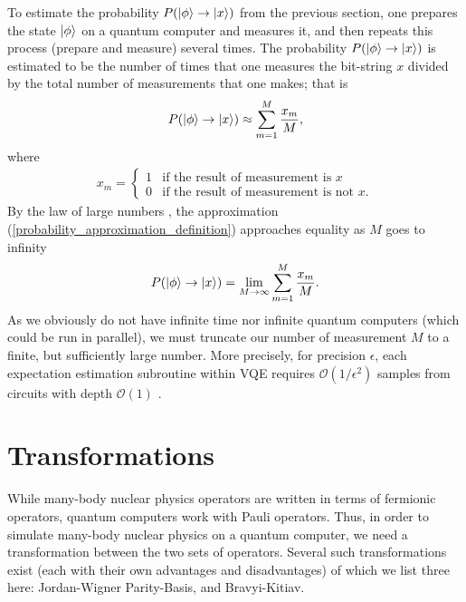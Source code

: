 \documentclass[Dual]{msu-thesis}
\begin{document}
To estimate the probability $P(\ket{\phi}\to \ket{x})$ from the previous section, one prepares the state $\ket{\phi}$ on a quantum computer and measures it, and then repeats this process (prepare and measure) several times. The probability $P(\ket{\phi}\to \ket{x})$ is estimated to be the number of times that one measures the bit-string $x$ divided by the total number of measurements that one makes; that is
\begin{align}
\label{probability_approximation_definition}
P(\ket{\phi}\to \ket{x}) \approx \sum_{m=1}^M\frac{x_m}{M}
,\end{align}
where 
\begin{align}
x_m
=
\begin{cases}
1 & \text{if the result of measurement is $x$} 
\\
0 & \text{if the result of measurement is not $x$}.
\end{cases}
\end{align}
By the law of large numbers \cite{ref:lln}, the approximation (\ref{probability_approximation_definition}) approaches equality as $M$ goes to infinity
\begin{align}
\label{probability_approximation_definition}
P(\ket{\phi}\to \ket{x}) = \lim_{M\to\infty}\sum_{m=1}^M\frac{x_m}{M}
.\end{align}
As we obviously do not have infinite time nor infinite quantum computers (which could be run in parallel), we must truncate our number of measurement $M$ to a finite, but sufficiently large number. More precisely, for precision $\epsilon$, each expectation estimation subroutine within VQE requires $\mathcal{O}(1/\epsilon^2)$ samples from circuits with depth $\mathcal{O}(1)$ \cite{ref:precision}.

\section{Transformations}

While many-body nuclear physics operators are written in terms of fermionic operators, quantum computers work with Pauli operators. Thus, in order to simulate many-body nuclear physics on a quantum computer, we need a transformation between the two sets of operators. Several such transformations exist \cite{ref:transformations} (each with their own advantages and disadvantages) of which we list three here: Jordan-Wigner Parity-Basis, and Bravyi-Kitiav.
\end{document}
